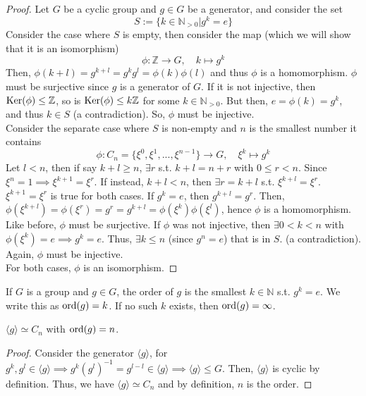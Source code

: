 \documentclass[a4paper]{article}
\begin{document}
\begin{proof}
Let $G$ be a cyclic group and $g\in G$ be a generator, and consider the set
$$S:=\{k\in\mathbb{N}_{>0}|g^k=e\}$$
Consider the case where $S$ is empty, then consider the map (which we will show that it is an isomorphism)
$$\phi:\mathbb{Z}\rightarrow G,\quad k\mapsto g^k$$
Then, $\phi(k+l)=g^{k+l}=g^kg^l=\phi(k)\phi(l)$ and thus $\phi$ is a homomorphism. $\phi$ must be surjective since $g$ is a generator of $G$. If it is not injective, then $\operatorname{Ker}(\phi)\leq\mathbb{Z}$, so is $\operatorname{Ker}(\phi)\leq k\mathbb{Z}$ for some $k\in\mathbb{N}_{>0}$. But then, $e=\phi(k)=g^k$, and thus $k\in S$ (a contradiction). So, $\phi$ must be injective.\\[5pt]
Consider the separate case where $S$ is non-empty and $n$ is the smallest number it contains
$$\phi:C_n=\{\xi^0,\xi^1,...,\xi^{n-1}\}\rightarrow G,\quad \xi^k\mapsto g^k$$
Let $l<n$, then if say $k+l\geq n$, $\exists r$ s.t. $k+l=n+r$ with $0\leq r<n$. Since $\xi^n=1\implies\xi^{k+1}=\xi^r$. If instead, $k+l<n$, then $\exists r=k+l$ s.t. $\xi^{k+l}=\xi^r$.\\[5pt]
$\xi^{k+1}=\xi^r$ is true for both cases. If $g^k=e$, then $g^{k+l}=g^r$. Then, $\phi(\xi^{k+l})=\phi(\xi^r)=g^r=g^{k+l}=\phi(\xi^k)\phi(\xi^l)$, hence $\phi$ is a homomorphism. Like before, $\phi$ must be surjective. If $\phi$ was not injective, then $\exists 0<k<n$ with $\phi(\xi^k)=e\implies g^k=e$. Thus, $\exists k\leq n$ (since $g^n=e$) that is in $S$. (a contradiction). Again, $\phi$ must be injective.\\[5pt]
For both cases, $\phi$ is an isomorphism.
\end{proof}
\begin{defi}[Order]
If $G$ is a group and $g\in G$, the order of $g$ is the smallest $k\in\mathbb{N}$ s.t. $g^k=e$. We write this as $\operatorname{ord}(g)=k$. If no such $k$ exists, then $\operatorname{ord}(g)=\infty$.
\end{defi}
\begin{cor}
$\langle g\rangle\simeq C_n$ with $\operatorname{ord}(g)=n$.
\end{cor}
\begin{proof}
Consider the generator $\langle g\rangle$, for $g^k,g^l\in\langle g\rangle\implies g^k(g^l)^{-1}=g^{l-l}\in\langle g\rangle\implies\langle g\rangle\leq G$. Then, $\langle g\rangle$ is cyclic by definition. Thus, we have $\langle g\rangle\simeq C_n$ and by definition, $n$ is the order.
\end{proof}
\newpage
\end{document}
